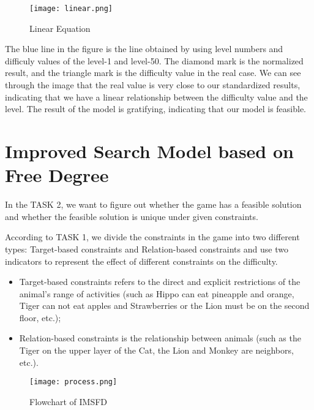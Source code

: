 \documentclass{mcmthesis}
\begin{document}
			
			\begin{figure}[h]
				\small
				\centering
				\texttt{[image: linear.png]}
				\caption{Linear Equation} 
				\label{fig:linear}
			\end{figure}
		
			The blue line in the figure is the line obtained by using level numbers and difficuly values of the level-1 and level-50. The diamond mark is the normalized result, and the triangle mark is the difficulty value in the real case. We can see through the image that the real value is very close to our standardized results, indicating that we have a linear relationship between the difficulty value and the level. The result of the model is gratifying, indicating that our model is feasible.
			
	
	\section{Improved Search Model based on Free Degree}
	
		In the TASK 2, we want to figure out whether the game has a feasible solution and whether the feasible solution is unique under given constraints.
	
		According to TASK 1, we divide the constraints in the game into two different types: Target-based constraints and Relation-based constraints and use two indicators to represent the effect of different constraints on the difficulty. 
	
		\begin{itemize}
		
			\item Target-based constraints refers to the direct and explicit restrictions of the animal's range of activities (such as Hippo can eat pineapple and orange, Tiger can not eat apples and Strawberries or the Lion must be on the second floor, etc.);
		
			\item Relation-based constraints is the relationship between animals (such as the Tiger on the upper layer of the Cat, the Lion and Monkey are neighbors, etc.).
		\end{itemize}
	
		\clearpage
		
		\begin{figure}[b]
			\small
			\centering
			\texttt{[image: process.png]}
			\caption{Flowchart of IMSFD} 
			\label{fig:process}
		\end{figure}
	
\end{document}
